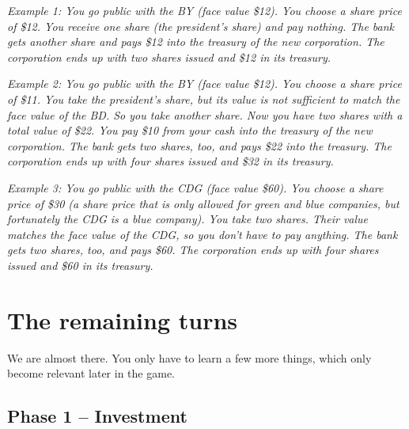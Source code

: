 \documentclass[10pt,final]{report}
\begin{document}
\begin{multicols}{2}
\emph{Example 1: You go public with the BY (face value \$12). You
  choose a share price of \$12. You receive one share (the president's
  share) and pay nothing. The bank gets another share and pays \$12
  into the treasury of the new corporation. The corporation ends up
  with two shares issued and \$12 in its treasury.}

\emph{Example 2: You go public with the BY (face value \$12). You
  choose a share price of \$11. You take the president's share, but
  its value is not sufficient to match the face value of the BD. So
  you take another share. Now you have two shares with a total value
  of \$22. You pay \$10 from your cash into the treasury of the new
  corporation. The bank gets two shares, too, and pays \$22 into the
  treasury. The corporation ends up with four shares issued and \$32
  in its treasury.}

\emph{Example 3: You go public with the CDG (face value \$60). You
  choose a share price of \$30 (a share price that is only allowed for
  green and blue companies, but fortunately the CDG is a blue
  company). You take two shares. Their value matches the face value of
  the CDG, so you don't have to pay anything. The bank gets two shares,
  too, and pays \$60. The corporation ends up with four shares issued
  and \$60 in its treasury.}

\section{The remaining turns}

We are almost there. You only have to learn a few more things, which
only become relevant later in the game.

\subsection{Phase 1 -- Investment}
\label{t3p1}


\end{multicols}
\end{document}

